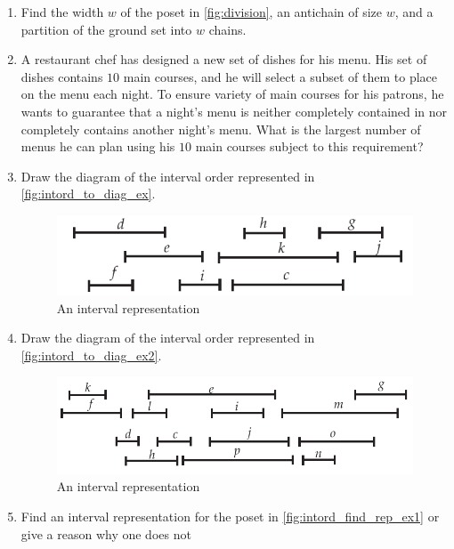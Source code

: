 \begin{enumerate}
\begin{center}
  \end{center}
\item Find the width $w$ of the poset in \autoref{fig:division}, an
  antichain of size $w$, and a partition of the ground set into $w$
  chains.
\item A restaurant chef has designed a new set of dishes for his
  menu. His set of dishes contains $10$ main courses, and he will
  select a subset of them to place on the menu each night. To ensure
  variety of main courses for his patrons, he wants to guarantee that
  a night's menu is neither completely contained in nor completely
  contains another night's menu. What is the largest number of menus
  he can plan using his $10$ main courses subject to this requirement?
\item Draw the diagram of the interval order represented in
  \autoref{fig:intord_to_diag_ex}.
  \begin{figure}[h]
  \begin{center}
    \includegraphics{posets-figs/intord_to_diag_ex}
  \end{center}
  \caption{An interval representation}\label{fig:intord_to_diag_ex}
  \end{figure}
\item Draw the diagram of the interval order represented in
  \autoref{fig:intord_to_diag_ex2}.
  \begin{figure}[h]
  \begin{center}
    \includegraphics{posets-figs/intord_to_diag_ex2}
  \end{center}
  \caption{An interval representation}\label{fig:intord_to_diag_ex2}
  \end{figure}
\item Find an interval representation for the poset in
  \autoref{fig:intord_find_rep_ex1} or give a reason why one does not

\end{enumerate}
